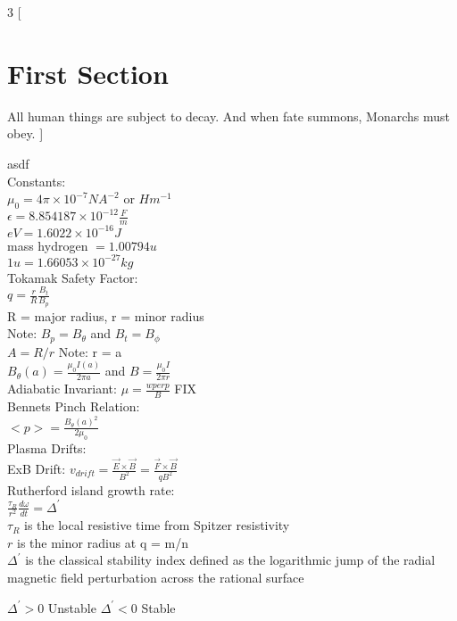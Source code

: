 \documentclass{article}
\begin{document}
\begin{multicols}{3}
[
\section{First Section}
All human things are subject to decay. And when fate summons, Monarchs must obey.
]

asdf\\


Constants:\\
$\mu_{0} = 4 \pi \times 10 ^{-7} NA^{-2}$ or $Hm^{-1} $\\
$\epsilon = 8.854187 \times 10 ^{-12} \frac{F}{m}$\\	
$eV = 1.6022\times 10 ^{-16} J$\\
mass hydrogen $ = 1.00794u  $\\
$1u = 1.66053 \times 10^{-27} kg $\\

Tokamak Safety Factor:\\
$q = \frac{r}{R}\frac{B_{t}}{B_{p}}$\\
R =  major radius, r = minor radius\\
Note: $B_{p} = B_{\theta}$ and $B_{t} = B_{\phi}$\\
$A = R / r$ Note: r = a\\
$B_{\theta}(a) = \frac{\mu_{0}I(a)}{2 \pi a}$ and $B = \frac{\mu_{0}I}{2\pi r}$\\
Adiabatic Invariant: $\mu = \frac{wperp}{B}$ FIX\\

Bennets Pinch Relation: \\
$<p> = \frac{B_{\theta}(a)^{2}}{2\mu_{0}}$\\

Plasma Drifts:\\
ExB Drift: $v_{drift} = \frac{\vec{E}\times\vec{B}}{B^{2}} = \frac{\vec{F}\times\vec{B}}{qB^{2}}$\\

Rutherford island growth rate:\\
$\frac{\tau_{R}}{r^{2}} \frac{d\omega}{dt} = \Delta ^{\prime}$\\
$\tau_{R}$ is the local resistive time from Spitzer resistivity \\
$r$ is the minor radius at q = m/n\\
$\Delta ^{\prime}$ is the classical stability index defined as the logarithmic jump of the radial magnetic field perturbation across the rational surface

$\Delta ^{\prime} > 0$ Unstable 
$\Delta ^{\prime} < 0$ Stable  


\end{multicols}
\end{document}
